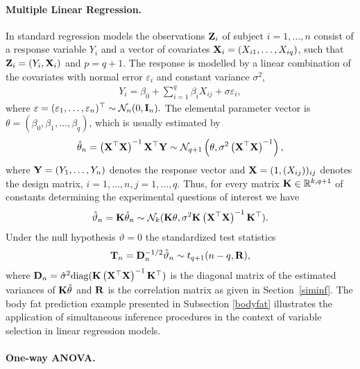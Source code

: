 \documentclass[12pt,a4paper]{article}
\begin{document}
\paragraph{Multiple Linear Regression.}

In standard regression models the observations $\mathbf{Z}_i$ of subject $i=1,
\ldots, n$ consist of a response variable $Y_i$ and a vector of covariates $%
\X_i = (X_{i1}, \dots, X_{iq})$, such that $\mathbf{Z}_i = (Y_i, \mathbf{X}_i)$ and $p = q +
1$. The response is modelled by a linear combination of the covariates with
normal error $\varepsilon_i$ and constant variance $\sigma^2$, 
\begin{eqnarray*}
Y_i = \beta_0 + \sum_{i = 1}^q \beta_i X_{ij} + \sigma \varepsilon_i,
\end{eqnarray*}
where $\varepsilon = (\varepsilon_1, \dots, \varepsilon_n)^\top \sim \mathcal{N}_n(0, 
\mathbf{I}_n).$ The elemental parameter vector is $\theta = (\beta_0,
\beta_1, \dots, \beta_q)$, which is usually estimated by 
\begin{eqnarray*}
\hat{\theta}_n = \left(\X^\top\X\right)^{-1} \X^\top \Y \sim \N%
_{q+1}\left(\theta, \sigma^2 \left(\X^\top\X\right)^{-1}\right),
\end{eqnarray*}
where $\mathbf{Y} = (Y_1, \dots, Y_n)$ denotes the response vector and $\mathbf{X}
= (1, (X_{ij}))_{ij}$ denotes the design matrix, $i = 1, \dots, n, j = 1,
\dots, q$. Thus, for every matrix $\mathbf{K} \in \mathbb{R}^{k,q+1}$ of constants
determining the experimental questions of interest we have 
\begin{eqnarray*}
\hat{\vartheta}_n = \K \hat{\theta}_n \sim \N_k(\K \theta, \sigma^2 \K \left(\X^\top\X%
\right)^{-1} \K^\top).
\end{eqnarray*}
Under the null hypothesis $\vartheta = 0$ the standardized test
statistics 
\begin{eqnarray*}
\mathbf{T}_n = \mathbf{D}_n^{-1/2} \hat{\vartheta}_n \sim t_{q+1}(n - q, \mathbf{R}),
\end{eqnarray*}
where $\mathbf{D}_n = \hat{\sigma}^2 \text{diag}(\mathbf{K} \left(\mathbf{X}^\top\mathbf{X} \right)^{-1} \mathbf{K}^\top)$ is the diagonal matrix of the estimated variances 
of $\mathbf{K} \hat{\theta}$ and $\mathbf{R}$ is the correlation matrix as
given in Section~\ref{siminf}. The body fat prediction example presented in
Subsection \ref{bodyfat} illustrates the application of simultaneous
inference procedures in the context of variable selection in linear
regression models.

\paragraph{One-way ANOVA.}
\end{document}

